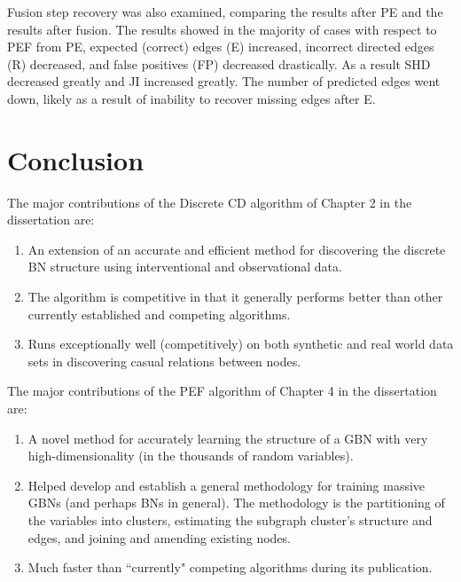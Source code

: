 \documentclass[twoside,11pt]{article}
\begin{document}
Fusion step recovery was also examined, comparing the results after PE and the results after fusion. The results showed in the majority of cases with respect to PEF from PE, expected (correct) edges (E) increased, incorrect directed edges (R) decreased, and false positives (FP) decreased drastically. As a result SHD decreased greatly and JI increased greatly. The number of predicted edges went down, likely as a result of inability to recover missing edges after E.


\section{Conclusion}

The major contributions of the Discrete CD algorithm of Chapter 2 in the dissertation are:\begin{enumerate}
    \item An extension of an accurate and efficient method for discovering the discrete BN structure using interventional and observational data.
    \item The algorithm is competitive in that it generally performs better than other currently established and competing algorithms.
    \item Runs exceptionally well (competitively) on both synthetic and real world data sets in discovering casual relations between nodes.
\end{enumerate}

The major contributions of the PEF algorithm of Chapter 4 in the dissertation are: \begin{enumerate}
    \item A novel method for accurately learning the structure of a GBN with very high-dimensionality (in the thousands of random variables).
    \item Helped develop and establish a general methodology for training massive GBNs (and perhaps BNs in general). The methodology is the partitioning of the variables into clusters, estimating the subgraph cluster's structure and edges, and joining and amending existing nodes. 
    \item Much faster than ``currently" competing algorithms during its publication.
\end{enumerate}



\vskip 0.2in

\end{document}
